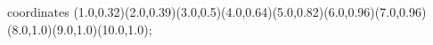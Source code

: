 					coordinates { (1.0,0.32)(2.0,0.39)(3.0,0.5)(4.0,0.64)(5.0,0.82)(6.0,0.96)(7.0,0.96)(8.0,1.0)(9.0,1.0)(10.0,1.0)};